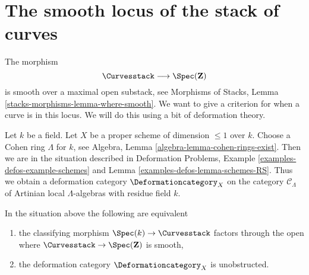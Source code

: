 \section{The smooth locus of the stack of curves}
\label{section-smooth}

\noindent
The morphism
$$
\Curvesstack \longrightarrow \Spec(\mathbf{Z})
$$
is smooth over a maximal open substack, see
Morphisms of Stacks, Lemma \ref{stacks-morphisms-lemma-where-smooth}.
We want to give a criterion for when a curve is in this locus.
We will do this using a bit of deformation theory.

\medskip\noindent
Let $k$ be a field. Let $X$ be a proper scheme of dimension $\leq 1$ over $k$.
Choose a Cohen ring $\Lambda$ for $k$, see
Algebra, Lemma \ref{algebra-lemma-cohen-rings-exist}.
Then we are in the situation described in
Deformation Problems, Example \ref{examples-defos-example-schemes} and
Lemma \ref{examples-defos-lemma-schemes-RS}.
Thus we obtain a deformation category $\Deformationcategory_X$
on the category $\mathcal{C}_\Lambda$ of Artinian local
$\Lambda$-algebras with residue field $k$.

\begin{lemma}
\label{lemma-in-smooth-locus}
In the situation above the following are equivalent
\begin{enumerate}
\item the classifying morphism $\Spec(k) \to \Curvesstack$ factors
through the open where $\Curvesstack \to \Spec(\mathbf{Z})$ is smooth,
\item the deformation category $\Deformationcategory_X$ is unobstructed.
\end{enumerate}
\end{lemma}

